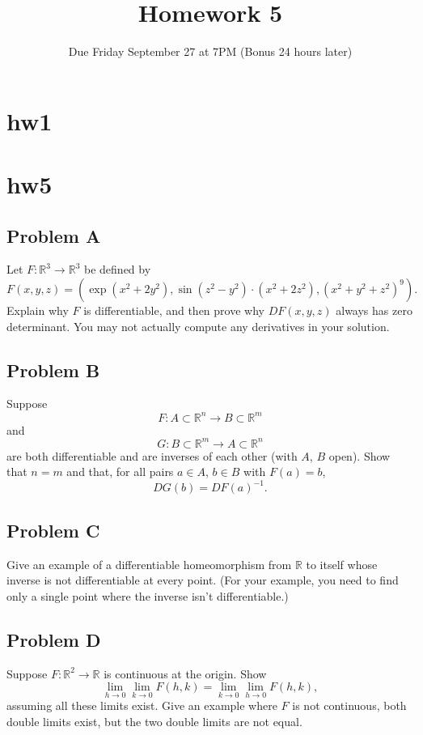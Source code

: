 \documentclass[lang=en,11pt]{template}
\title{Homework 5}
\author{}
\date{Due Friday September 27 at 7PM (Bonus 24 hours later)}
\begin{document}
   

\chapter{hw1}













\chapter{hw5}

\section*{Problem A}
Let $F : \mathbb{R}^3 \to \mathbb{R}^3$ be defined by
\[
F(x, y, z) = (\exp(x^2 + 2y^2), \sin(z^2 - y^2) \cdot (x^2 + 2z^2), (x^2 + y^2 + z^2)^9).
\]
Explain why $F$ is differentiable, and then prove why $DF(x, y, z)$ always has zero determinant. You may not actually compute any derivatives in your solution.

\section*{Problem B}
Suppose
\[
F : A \subset \mathbb{R}^n \to B \subset \mathbb{R}^m
\]
and
\[
G : B \subset \mathbb{R}^m \to A \subset \mathbb{R}^n
\]
are both differentiable and are inverses of each other (with $A$, $B$ open). Show that $n = m$ and that, for all pairs $a \in A$, $b \in B$ with $F(a) = b$,
\[
DG(b) = DF(a)^{-1}.
\]

\section*{Problem C}
Give an example of a differentiable homeomorphism from $\mathbb{R}$ to itself whose inverse is not differentiable at every point. (For your example, you need to find only a single point where the inverse isn’t differentiable.)

\section*{Problem D}
Suppose $F : \mathbb{R}^2 \to \mathbb{R}$ is continuous at the origin. Show
\[
\lim_{h \to 0} \lim_{k \to 0} F(h, k) = \lim_{k \to 0} \lim_{h \to 0} F(h, k),
\]
assuming all these limits exist. Give an example where $F$ is not continuous, both double limits exist, but the two double limits are not equal.
\end{document}

